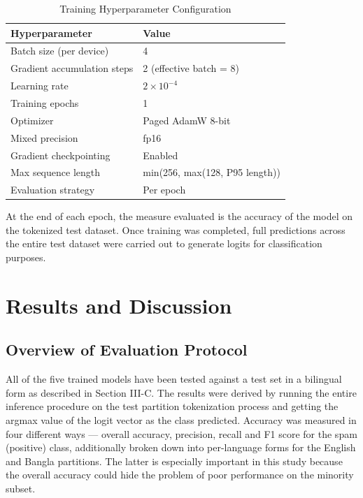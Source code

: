 \documentclass[journal]{IEEEtran}
\begin{document}
\begin{table}[htbp]
\caption{Training Hyperparameter Configuration}
\label{tab:hyperparams}
\begin{center}
\begin{tabular}{ll}
\toprule
\textbf{Hyperparameter} & \textbf{Value} \\
\midrule
Batch size (per device) & 4 \\
Gradient accumulation steps & 2 (effective batch = 8) \\
Learning rate & $2 \times 10^{-4}$ \\
Training epochs & 1 \\
Optimizer & Paged AdamW 8-bit \\
Mixed precision & fp16 \\
Gradient checkpointing & Enabled \\
Max sequence length & min(256, max(128, P95 length)) \\
Evaluation strategy & Per epoch \\
\bottomrule
\end{tabular}
\end{center}
\end{table}

At the end of each epoch, the measure evaluated is the accuracy of the
model on the tokenized test dataset. Once training was completed, full
predictions across the entire test dataset were carried out to generate
logits for classification purposes.



\section{Results and Discussion}

\subsection{Overview of Evaluation Protocol}

All of the five trained models have been tested against a test set in a bilingual form as described in Section III-C. The results were derived by running the entire inference procedure on the test partition tokenization process and getting the argmax value of the logit vector as the class predicted. Accuracy was measured in four different ways --- overall accuracy, precision, recall and F1 score for the spam (positive) class, additionally broken down into per-language forms for the English and Bangla partitions. The latter is especially important in this study because the overall accuracy could hide the problem of poor performance on the minority subset.
\end{document}
